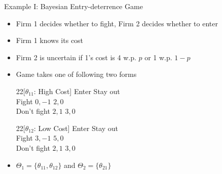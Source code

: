 \documentclass[11pt,aspectratio=169]{beamer}
\begin{document}
  
  \begin{frame}{Example I: Bayesian Entry-deterrence Game}
   \begin{itemize}
    \item Firm 1 decides whether to fight, Firm 2 decides whether to enter
    \item Firm 1 knows its cost
    \item Firm 2 is uncertain if 1's cost is 4 w.p. $p$ or 1 w.p. $1-p$
    \item Game takes one of following two forms
    \vspace{1em}
    \begin{center} \scriptsize
     \begin{game}{2}{2}[$\theta_{11}$: High Cost]
      				\> Enter		\>	Stay out	\\
      Fight			\> $0, -1$	\>	$2, 0$	\\
      Don't fight	\> $2, 1$	\>	$3, 0$
     \end{game}\hspace{2cm}
     \begin{game}{2}{2}[$\theta_{12}$: Low Cost]
      				\> Enter		\>	Stay out	\\
      Fight			\> $3, -1$	\>	$5, 0$	\\
      Don't fight	\> $2, 1$	\>	$3, 0$
     \end{game}
    \end{center}
    \vspace{1em}
    \item $\Theta_1 = \{\theta_{11}, \theta_{12}\}$ and $\Theta_2 = \{\theta_{21}\}$
   \end{itemize}  
  \end{frame}
  
\end{document}
